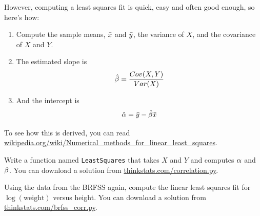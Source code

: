 \documentclass[12pt]{book}
\begin{document}
However, computing a least squares fit is quick, easy and often good
enough, so here's how:

\begin{enumerate}

\item Compute the sample means, $\bar{x}$ and $\bar{y}$, the variance
of $X$, and the covariance of $X$ and $Y$.

\item The estimated slope is
%
\[ \hat{\beta} = \frac{Cov(X,Y)}{Var(X)} \]
%
\item And the intercept is
%
\[ \hat{\alpha} = \bar{y} - \hat{\beta} \bar{x} \]
%
\end{enumerate}

To see how this is derived, you can read
\url{wikipedia.org/wiki/Numerical_methods_for_linear_least_squares}.


\begin{ex}

Write a function named {\tt LeastSquares} that takes $X$ and $Y$ and
computes $\alpha$ and $\beta$.  You can download a solution from
\url{thinkstats.com/correlation.py}.


\end{ex}

\begin{ex}


Using the data from the BRFSS again, compute the linear least squares
fit for $\log(\mathrm{weight})$ versus height.  You can download a
solution from \url{thinkstats.com/brfss_corr.py}.

\end{ex}
\end{document}
